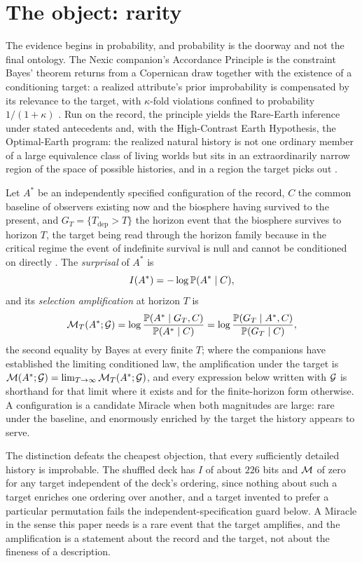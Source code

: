 \section{The object: rarity}\label{sec:rarity}

The evidence begins in probability, and probability is the doorway and not
the final ontology. The Nexic companion's Accordance Principle is the
constraint Bayes' theorem returns from a Copernican draw together with the
existence of a conditioning target: a realized attribute's prior improbability
is compensated by its relevance to the target, with $\kappa$-fold violations
confined to probability $1/(1+\kappa)$ \cite{Nexus,GoldenTargeted}. Run on the
record, the principle yields the Rare-Earth inference under stated antecedents
and, with the High-Contrast Earth Hypothesis, the Optimal-Earth program: the
realized natural history is not one ordinary member of a large equivalence
class of living worlds but sits in an extraordinarily narrow region of the
space of possible histories, and in a region the target picks out
\cite{AethusOptimalEarth}.

\begin{definition}\label{def:magnitudes}
Let $A^\ast$ be an independently specified configuration of the record,
$C$ the common baseline of observers existing now and the biosphere
having survived to the present, and $G_T=\{T_{\mathrm{dep}}>T\}$ the
horizon event that the biosphere survives to horizon $T$, the target
being read through the horizon family because in the critical regime
the event of indefinite survival is null and cannot be conditioned on
directly \cite{GoldenSurvivorship,GoldenTargeted}. The \emph{surprisal} of $A^\ast$ is
\[
I(A^\ast)=-\log\mathbb{P}(A^\ast\mid C),
\]
and its \emph{selection amplification} at horizon $T$ is
\[
\mathcal{M}_T(A^\ast;\mathcal{G})=\log\frac{\mathbb{P}(A^\ast\mid G_T,C)}{\mathbb{P}(A^\ast\mid C)}
=\log\frac{\mathbb{P}(G_T\mid A^\ast,C)}{\mathbb{P}(G_T\mid C)},
\]
the second equality by Bayes at every finite $T$; where the companions
have established the limiting conditioned law, the amplification under
the target is $\mathcal{M}(A^\ast;\mathcal{G})=\lim_{T\to\infty}\mathcal{M}_T(A^\ast;\mathcal{G})$, and
every expression below written with $\mathcal{G}$ is shorthand for that limit
where it exists and for the finite-horizon form otherwise. A
configuration is a candidate Miracle when both magnitudes are large:
rare under the baseline, and enormously enriched by the target the
history appears to serve.
\end{definition}

The distinction defeats the cheapest objection, that every sufficiently
detailed history is improbable. The shuffled deck has $I$ of about $226$ bits
and $\mathcal{M}$ of zero for any target independent of the deck's ordering, since
nothing about such a target enriches one ordering over another, and a target
invented to prefer a particular permutation fails the independent-specification
guard below. A Miracle in the sense this paper needs is a rare event that the
target amplifies, and the amplification is a statement about the record and
the target, not about the fineness of a description.

